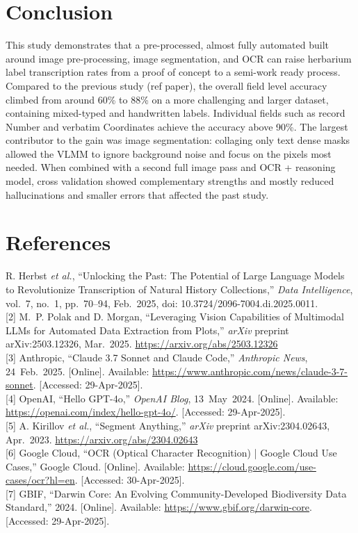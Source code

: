 \documentclass{article}
\begin{document}
\section*{Conclusion}
This study demonstrates that a pre-processed, almost fully automated built around image pre-processing, image segmentation, and OCR can raise herbarium label transcription rates from a proof of concept to a semi-work ready process. Compared to the previous study (ref paper), the overall field level accuracy climbed from around 60\% to 88\% on a more challenging and larger dataset, containing mixed-typed and handwritten labels. Individual fields such as record Number and verbatim Coordinates achieve the accuracy above 90\%. The largest contributor to the gain was image segmentation: collaging only text dense masks allowed the VLMM to ignore background noise and focus on the pixels most needed. When combined with a second full image pass and OCR + reasoning model, cross validation showed complementary strengths and mostly reduced hallucinations and smaller errors that affected the past study.  


\section*{References}
\small
\noindent
[1] R. Herbst \emph{et al.}, “Unlocking the Past: The Potential of Large Language Models to Revolutionize Transcription of Natural History Collections,” \emph{Data Intelligence}, vol.~7, no.~1, pp.~70–94, Feb.~2025, doi: 10.3724/2096-7004.di.2025.0011.\\[0.5em]

[2] M.~P. Polak and D. Morgan, “Leveraging Vision Capabilities of Multimodal LLMs for Automated Data Extraction from Plots,” \emph{arXiv} preprint arXiv:2503.12326, Mar.~2025. \url{https://arxiv.org/abs/2503.12326}\\[0.5em]

[3] Anthropic, “Claude 3.7 Sonnet and Claude Code,” \emph{Anthropic News}, 24~Feb.~2025. [Online]. Available: \url{https://www.anthropic.com/news/claude-3-7-sonnet}. [Accessed: 29-Apr-2025].\\[0.5em]

[4] OpenAI, “Hello GPT-4o,” \emph{OpenAI Blog}, 13~May~2024. [Online]. Available: \url{https://openai.com/index/hello-gpt-4o/}. [Accessed: 29-Apr-2025].\\[0.5em]

[5] A. Kirillov \emph{et al.}, “Segment Anything,” \emph{arXiv} preprint arXiv:2304.02643, Apr.~2023. \url{https://arxiv.org/abs/2304.02643}\\[0.5em]

[6] Google Cloud, “OCR (Optical Character Recognition) | Google Cloud Use Cases,” Google Cloud. [Online]. Available: \url{https://cloud.google.com/use-cases/ocr?hl=en}. [Accessed: 30-Apr-2025].\\[0.5em]

[7] GBIF, “Darwin Core: An Evolving Community-Developed Biodiversity Data Standard,” 2024. [Online]. Available: \url{https://www.gbif.org/darwin-core}. [Accessed: 29-Apr-2025].
\end{document}
